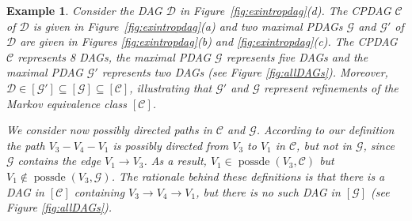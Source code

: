 \documentclass[11pt,a4paper]{article}
\newtheorem{Example}[Satz]{Example}
\theoremstyle{definition}
\theoremstyle{remark}
\DeclareMathOperator{\possde}{possde}
\newcommand{\mpdag}{maximal PDAG}
\newcommand{\g}[1][G]{\mathcal{#1}}
\begin{document}
 \begin{Example}\label{ex: CPDAGs, PDAGs and possibly directed}    
 	Consider the DAG $\g[D]$ in Figure~\ref{fig:exintropdag}(d). The CPDAG $\g[C]$ of $\g[D]$ is given in Figure~\ref{fig:exintropdag}(a) and two \mpdag{}s $\g$ and $\g'$ of $\g[D]$ are given in  Figures \ref{fig:exintropdag}(b) and \ref{fig:exintropdag}(c). The CPDAG $\g[C]$ represents 8 DAGs, the \mpdag{} $\g$ represents five DAGs and the \mpdag{} $\g'$ represents two DAGs (see Figure \ref{fig:allDAGs}). Moreover, $\g[D] \in [\g'] \subseteq [\g] \subseteq [\g[C]]$, illustrating that $\g'$ and $\g$ represent refinements of the Markov equivalence class $[\g[C]]$.
 	
 	We consider now possibly directed paths in $\g[C]$ and $\g$. According to our definition the path $V_3-V_4-V_1$ is possibly directed from $V_3$ to $V_1$ in $\g[C]$, but not in $\g$, since $\g$ contains the edge $V_1\rightarrow V_3$. As a result, $V_1 \in \possde(V_3,\g[C])$ but $V_1 \notin \possde(V_3,\g)$. The rationale behind these definitions is that there is a DAG in $[\g[C]]$ containing $V_3\to V_4\to V_1$, but there is no such DAG in $[\g]$ (see Figure \ref{fig:allDAGs}).
 	
 	
 	
 \end{Example}
 
\end{document}
